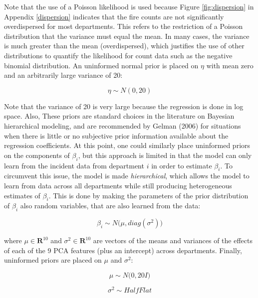 \documentclass{svjour3}
\begin{document}
Note that the use of a Poisson likelihood is used because Figure \ref{fig:dispersion} in Appendix \ref{dispersion} indicates that the fire counts are not significantly overdispersed for most departments. This refers to the restriction of a Poisson distribution that the variance must equal the mean. In many cases, the variance is much greater than the mean (overdispersed), which justifies the use of other distributions to quantify the likelihood for count data such as the negative binomial distribution. \noindent An uninformed normal prior is placed on $\eta$ with mean zero and an arbitrarily large variance of 20:

 \begin{equation}
  \label{eqn:eta_prior}
  \eta \sim N(0,20)
\end{equation}

\noindent Note that the variance of 20 is very large because the regression is done in log space. Also, These priors are standard choices in the literature on Bayesian hierarchical modeling, and are recommended by Gelman (2006) \cite{gelman2006prior} for situations when there is little or no subjective prior information available about the regression coefficients. At this point, one could similarly place uninformed priors on the components of $\beta_i$, but this approach is limited in that the model can only learn from the incident data from department $i$ in order to estimate $\beta_i$. To circumvent this issue, the model is made \textit{hierarchical}, which allows the model to learn from data across all departments while still producing heterogeneous estimates of $\beta_i$. This is done by making the parameters of the prior distribution of $\beta_i$ also random variables, that are also learned from the data:

 \begin{equation}
  \label{eqn:beta_prior}
  \beta_i \sim N\big(\mu,diag(\sigma^2)\big)
\end{equation}

\noindent where $\mu \in \textbf{R}^{10}$ and $\sigma^2 \in \textbf{R}^{10}$ are vectors of the means and variances of the effects of each of the 9 PCA features (plus an intercept) across departments. Finally, uninformed priors are placed on $\mu$ and $\sigma^2$:

 \begin{equation}
  \label{eqn:mu_prior}
  \mu \sim N\big(0,20I\big)
\end{equation}

 \begin{equation}
  \label{eqn:sigma2_prior}
  \sigma^2 \sim HalfFlat
\end{equation}
\end{document}
